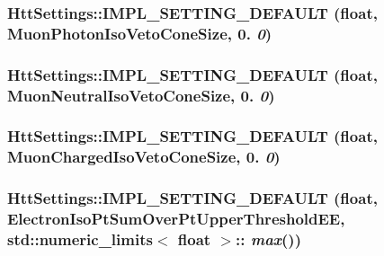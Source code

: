 \hypertarget{classHttSettings_a57cab6a96a01aa69019efeef1371c0ac}{
\subsubsection[{IMPL\_\-SETTING\_\-DEFAULT}]{\setlength{\rightskip}{0pt plus 5cm}HttSettings::IMPL\_\-SETTING\_\-DEFAULT (float, \/  MuonPhotonIsoVetoConeSize, \/  0. {\em 0})}}
\label{classHttSettings_a57cab6a96a01aa69019efeef1371c0ac}
\hypertarget{classHttSettings_afaa4bace4ed28ecc9e357f04edef811b}{
\subsubsection[{IMPL\_\-SETTING\_\-DEFAULT}]{\setlength{\rightskip}{0pt plus 5cm}HttSettings::IMPL\_\-SETTING\_\-DEFAULT (float, \/  MuonNeutralIsoVetoConeSize, \/  0. {\em 0})}}
\label{classHttSettings_afaa4bace4ed28ecc9e357f04edef811b}
\hypertarget{classHttSettings_a8abae07eb8a153952f975c7517e17a0b}{
\subsubsection[{IMPL\_\-SETTING\_\-DEFAULT}]{\setlength{\rightskip}{0pt plus 5cm}HttSettings::IMPL\_\-SETTING\_\-DEFAULT (float, \/  MuonChargedIsoVetoConeSize, \/  0. {\em 0})}}
\label{classHttSettings_a8abae07eb8a153952f975c7517e17a0b}
\hypertarget{classHttSettings_a93e1c8ff1fb422a3f051576e2b476992}{
\subsubsection[{IMPL\_\-SETTING\_\-DEFAULT}]{\setlength{\rightskip}{0pt plus 5cm}HttSettings::IMPL\_\-SETTING\_\-DEFAULT (float, \/  ElectronIsoPtSumOverPtUpperThresholdEE, \/  std::numeric\_\-limits$<$ float $>$:: {\em max}())}}
\label{classHttSettings_a93e1c8ff1fb422a3f051576e2b476992}
